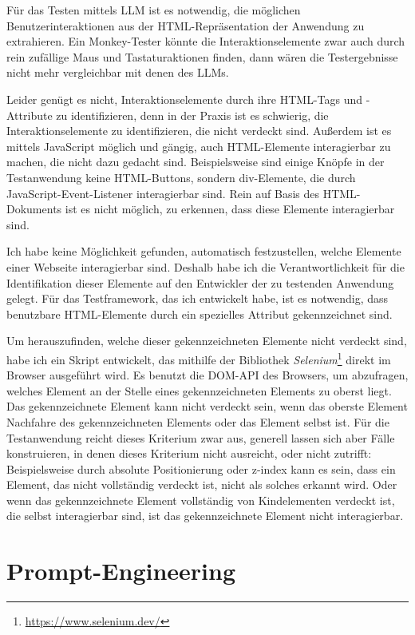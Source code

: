 Für das Testen mittels LLM ist es notwendig, die möglichen Benutzerinteraktionen aus der HTML-Repräsentation der Anwendung zu extrahieren.
Ein Monkey-Tester könnte die Interaktionselemente zwar auch durch rein zufällige Maus und Tastaturaktionen finden, dann wären die Testergebnisse nicht mehr vergleichbar mit denen des LLMs.

Leider genügt es nicht, Interaktionselemente durch ihre HTML-Tags und -Attribute zu identifizieren, denn in der Praxis ist es schwierig, die Interaktionselemente zu identifizieren, die nicht verdeckt sind.
Außerdem ist es mittels JavaScript möglich und gängig, auch HTML-Elemente interagierbar zu machen, die nicht dazu gedacht sind.
Beispielsweise sind einige Knöpfe in der Testanwendung keine HTML-Buttons, sondern div-Elemente, die durch JavaScript-Event-Listener interagierbar sind.
Rein auf Basis des HTML-Dokuments ist es nicht möglich, zu erkennen, dass diese Elemente interagierbar sind.

Ich habe keine Möglichkeit gefunden, automatisch festzustellen, welche Elemente einer Webseite interagierbar sind.
Deshalb habe ich die Verantwortlichkeit für die Identifikation dieser Elemente auf den Entwickler der zu testenden Anwendung gelegt.
Für das Testframework, das ich entwickelt habe, ist es notwendig, dass benutzbare HTML-Elemente durch ein spezielles Attribut gekennzeichnet sind.

Um herauszufinden, welche dieser gekennzeichneten Elemente nicht verdeckt sind, habe ich ein Skript entwickelt, das mithilfe der Bibliothek \textit{Selenium}\footnote{\url{https://www.selenium.dev/}} direkt im Browser ausgeführt wird.
Es benutzt die DOM-API des Browsers, um abzufragen, welches Element an der Stelle eines gekennzeichneten Elements zu oberst liegt.
Das gekennzeichnete Element kann nicht verdeckt sein, wenn das oberste Element Nachfahre des gekennzeichneten Elements oder das Element selbst ist.
Für die Testanwendung reicht dieses Kriterium zwar aus, generell lassen sich aber Fälle konstruieren, in denen dieses Kriterium nicht ausreicht, oder nicht zutrifft:
Beispielsweise durch absolute Positionierung oder z-index kann es sein, dass ein Element, das nicht vollständig verdeckt ist, nicht als solches erkannt wird.
Oder wenn das gekennzeichnete Element vollständig von Kindelementen verdeckt ist, die selbst interagierbar sind, ist das gekennzeichnete Element nicht interagierbar.

\section{Prompt-Engineering}

